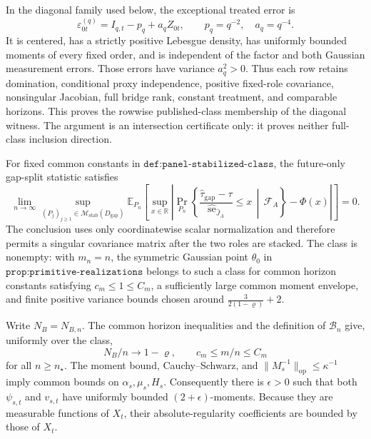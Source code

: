 In the diagonal family used below, the exceptional treated error is
\[
 \varepsilon_{0t}^{(q)}=I_{q,t}-p_q+a_qZ_{0t},\qquad p_q=q^{-2},\quad a_q=q^{-4}.
\]
It is centered, has a strictly positive Lebesgue density, has uniformly bounded moments of every fixed order, and is independent of the factor and both Gaussian measurement errors.  Those errors have variance \(a_q^2>0\).  Thus each row retains domination, conditional proxy independence, positive fixed-role covariance, nonsingular Jacobian, full bridge rank, constant treatment, and comparable horizons.  This proves the rowwise published-class membership of the diagonal witness.  The argument is an intersection certificate only: it proves neither full-class inclusion direction.

For fixed common constants in \(\texttt{def:panel-stabilized-class}\), the future-only gap-split statistic satisfies
\[
 \lim_{n\to\infty}
 \sup_{(P_j)_{j\geq1}\in\mathcal M_{\mathrm{stab}}(D_{\mathrm{gap}})}
 \mathbb E_{P_n}\!\left[
  \sup_{x\in\mathbb R}
  \left|
   \Pr_{P_n}\!\left\{
    \frac{\widehat\tau_{\mathrm{gap}}-\tau}
         {\widehat{\operatorname{se}}_{\widehat J_A}}
    \leq x\,\middle|\,\mathcal F_A
   \right\}-\Phi(x)
  \right|
 \right]=0.
\]
The conclusion uses only coordinatewise scalar normalization and therefore permits a singular covariance matrix after the two roles are stacked.  The class is nonempty: with \(m_n=n\), the symmetric Gaussian point \(\theta_0\) in \(\texttt{prop:primitive-realizations}\) belongs to such a class for common horizon constants satisfying \(c_m\leq1\leq C_m\), a sufficiently large common moment envelope, and finite positive variance bounds chosen around \(\frac{3}{2(1-\varrho)}+2\).

Write \(N_B=N_{B,n}\).  The common horizon inequalities and the definition of \(\mathcal B_n\) give, uniformly over the class,
\[
 N_B/n\to1-\varrho,
 \qquad c_m\leq m/n\leq C_m
\]
for all \(n\geq n_\star\).  The moment bound, Cauchy--Schwarz, and \(\|M_s^{-1}\|_{\mathrm{op}}\leq\kappa^{-1}\) imply common bounds on \(\alpha_s,\mu_s,H_s\).  Consequently there is \(\epsilon>0\) such that both \(\psi_{s,t}\) and \(v_{s,t}\) have uniformly bounded \((2+\epsilon)\)-moments.  Because they are measurable functions of \(X_t\), their absolute-regularity coefficients are bounded by those of \(X_t\).

